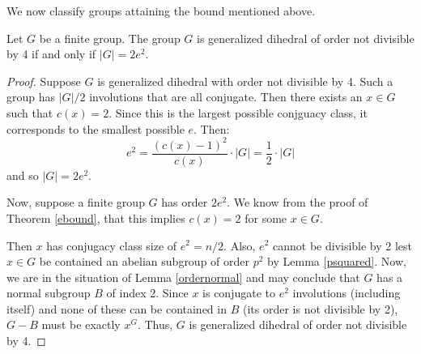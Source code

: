 \documentclass[main.tex]{subfiles}
\begin{document}
We now classify groups attaining the bound mentioned above.

\begin{theorem}\label{boundaryclassification}
Let $G$ be a finite group. The group $G$ is generalized dihedral of order not divisible by 4 if and only if $|G| = 2e^2$. 
\end{theorem}

\begin{proof}
Suppose $G$ is generalized dihedral with order not divisible by 4. Such a group has $|G|/2$ involutions that are all conjugate. Then there exists an $x \in G$ such that $c(x) = 2$. Since this is the largest possible conjguacy class, it corresponds to the smallest possible $e$. Then:
$$e^2 = \frac{(c(x) - 1)^2}{c(x)} \cdot |G| = \frac{1}{2} \cdot |G|$$
and so $|G| = 2e^2$.

Now, suppose a finite group $G$ has order $2e^2$. We know from the proof of Theorem \ref{ebound}, that this implies $c(x) = 2$ for some $x \in G$. 

Then $x$ has conjugacy class size of $e^2 = n / 2$. Also, $e^2$ cannot be divisible by 2 lest $x \in G$ be contained an abelian subgroup of order $p^2$ by Lemma \ref{psquared}.  Now, we are in the situation of Lemma \ref{ordernormal} and may conclude that $G$ has a normal subgroup $B$ of index 2. Since $x$ is conjugate to $e^2$ involutions (including itself) and none of these can be contained in $B$ (its order is not divisible by 2), $G - B$ must be exactly $x^G$. Thus, $G$ is generalized dihedral of order not divisible by 4.
\end{proof}
\end{document}
